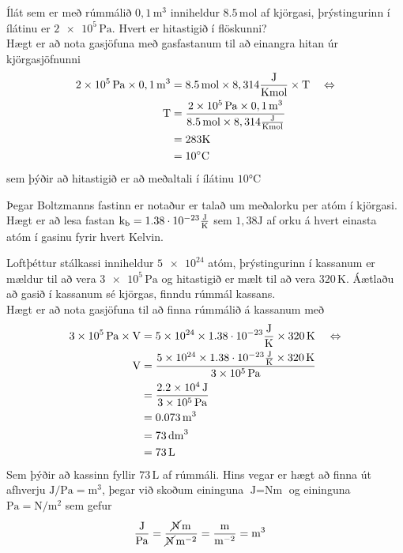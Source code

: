 \begin{formalexample}
	Ílát sem er með rúmmálið $0,1 \, \si{\metre\cubed}$ inniheldur 
	$\num{8,5} \, \si{\mole}$ af
	kjörgasi, þrýstingurinn í ílátinu er 
	$\num{2e5} \, \si{\pascal}$. Hvert er
	hitastigið í flöskunni?
	\\[4 ex]
	Hægt er að nota gasjöfuna með gasfastanum til að einangra hitan úr
	kjörgasjöfnunni
	\begin{align*}
		\num{2e5} \, \si{\pascal} \times 0,1 \, \si{\metre\cubed}
			&= \num{8,5} \, \si{\mole} \times 
				8,314 \frac{\textrm{J}}{\text{K} \text{mol}} \times \text{T} 
			&& \Leftrightarrow \\
		\text{T}  &= \frac{ \num{2e5} \, \si{\pascal} \times 0,1 \, 
				\si{\metre\cubed} }
			{ \num{8,5} \, \si{\mole} \times 8,314 \frac{\textrm{J}}{\text{K} \text{mol}} } \\
		&= 283 \si{\kelvin} \\
		&= 10 \si{\celsius}
	\end{align*}
	sem þýðir að hitastigið er að meðaltali í ílátinu $10 \si{\celsius}$
\end{formalexample}
Þegar Boltzmanns fastinn er
notaður er talað um meðalorku per atóm í kjörgasi. 
Hægt er að lesa fastan $\text{k}_\text{b} = 1.38 \cdot 10^{-23} \frac{\textrm{J}}{\text{K}}$ sem 
$1,38 \si{\joule}$ af orku á hvert einasta atóm í gasinu fyrir hvert Kelvin.
\begin{formalexample}
	Loftþéttur stálkassi inniheldur $\num{5e24}$ atóm, þrýstingurinn í kassanum
	er mældur til að vera $\num{3e5} \, \si{\pascal}$ og hitastigið er mælt til
	að vera $\num{320} \, \si{\kelvin}$. Áætlaðu að gasið í kassanum sé
	kjörgas, finndu rúmmál kassans.
	\\[4 ex]
	Hægt er að nota gasjöfuna til að finna rúmmálið á kassanum með
	\begin{align*}
		\num{3e5} \, \si{\pascal} \times \uvolume
			&= \num{5e24} \times \ugasconstantjk \times \num{320} \, \si{\kelvin}
			&& \Leftrightarrow \\
		\uvolume
			&= \frac{ 
				\num{5e24} \times \ugasconstantjk \times 
				\num{320} \, \si{\kelvin}
				}{
				\num{3e5} \, \si{\pascal}
				}
			\\
			&= \frac{ 
				\num{2.2e4} \, \si{\joule}
				}{
				\num{3e5} \, \si{\pascal}
				}
			\\
			&= \num{0.073} \, \si{\metre\cubed} \\
			&= \num{73} \, \si{\deci\metre\cubed} \\
			&= \num{73} \, \si{\liter}
	\end{align*}
	Sem þýðir að kassinn fyllir $\num{73} \, \si{\liter}$ af rúmmáli. Hins vegar
	er hægt að finna út afhverju $\si{\joule\per\pascal} = \si{\metre\cubed}$,
	þegar við skoðum eininguna $\si{\joule} = \si{\newton\metre}$ og eininguna
	$\si{\pascal} = \si{\newton\per\metre\squared}$ sem gefur
	\begin{align*}
		\frac{\si{\joule}}{\si{\pascal}} 
			&= 
			\frac{\si{\cancel\newton\metre}}{
				\si{\cancel\newton\per\metre\squared}}
			= 
			\frac{\si{\metre}}{
				\si{\per\metre\squared}}
			= 
			\si{\metre\cubed}
	\end{align*}
\end{formalexample}
